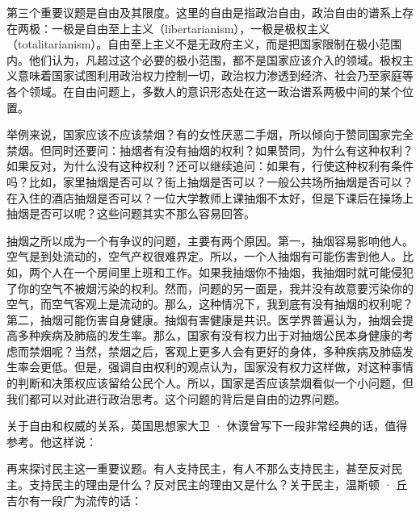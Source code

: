 第三个重要议题是自由及其限度。这里的自由是指政治自由，政治自由的谱系上存在两极：一极是自由至上主义（libertarianism），一极是极权主义（totalitarianism）。自由至上主义不是无政府主义，而是把国家限制在极小范围内。他们认为，凡超过这个必要的极小范围，都不是国家应该介入的领域。极权主义意味着国家试图利用政治权力控制一切，政治权力渗透到经济、社会乃至家庭等各个领域。在自由问题上，多数人的意识形态处在这一政治谱系两极中间的某个位置。

举例来说，国家应该不应该禁烟？有的女性厌恶二手烟，所以倾向于赞同国家完全禁烟。但同时还要问：抽烟者有没有抽烟的权利？如果赞同，为什么有这种权利？如果反对，为什么没有这种权利？还可以继续追问：如果有，行使这种权利有条件吗？比如，家里抽烟是否可以？街上抽烟是否可以？一般公共场所抽烟是否可以？在入住的酒店抽烟是否可以？一位大学教师上课抽烟不太好，但是下课后在操场上抽烟是否可以呢？这些问题其实不那么容易回答。

抽烟之所以成为一个有争议的问题，主要有两个原因。第一，抽烟容易影响他人。空气是到处流动的，空气产权很难界定。所以，一个人抽烟有可能伤害到他人。比如，两个人在一个房间里上班和工作。如果我抽烟你不抽烟，我抽烟时就可能侵犯了你的空气不被烟污染的权利。然而，问题的另一面是，我并没有故意要污染你的空气，而空气客观上是流动的。那么，这种情况下，我到底有没有抽烟的权利呢？第二，抽烟可能伤害自身健康。抽烟有害健康是共识。医学界普遍认为，抽烟会提高多种疾病及肺癌的发生率。那么，国家有没有权力出于对抽烟公民本身健康的考虑而禁烟呢？当然，禁烟之后，客观上更多人会有更好的身体，多种疾病及肺癌发生率会更低。但是，强调自由权利的观点认为，国家没有权力这样做，对这种事情的判断和决策权应该留给公民个人。所以，国家是否应该禁烟看似一个小问题，但我们都可以对此进行政治思考。这个问题的背后是自由的边界问题。

关于自由和权威的关系，英国思想家大卫 · 休谟曾写下一段非常经典的话，值得参考。他这样说：


再来探讨民主这一重要议题。有人支持民主，有人不那么支持民主，甚至反对民主。支持民主的理由是什么？反对民主的理由又是什么？关于民主，温斯顿 · 丘吉尔有一段广为流传的话：


